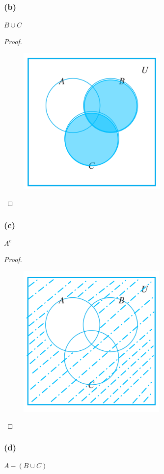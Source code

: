 \documentclass[14pt]{extarticle}
\begin{document}
\subsubsection{(b)}
$B \cup C$

\begin{proof}
\begin{figure}[ht!]
\centering
\includegraphics[scale=0.4]{../images/6.1.17.b.png}
\end{figure}
\end{proof}

\subsubsection{(c)}
$A^c$

\begin{proof}
\begin{figure}[ht!]
\centering
\includegraphics[scale=0.4]{../images/6.1.17.c.png}
\end{figure}
\end{proof}

\subsubsection{(d)}
$A - (B \cup C)$
\end{document}
